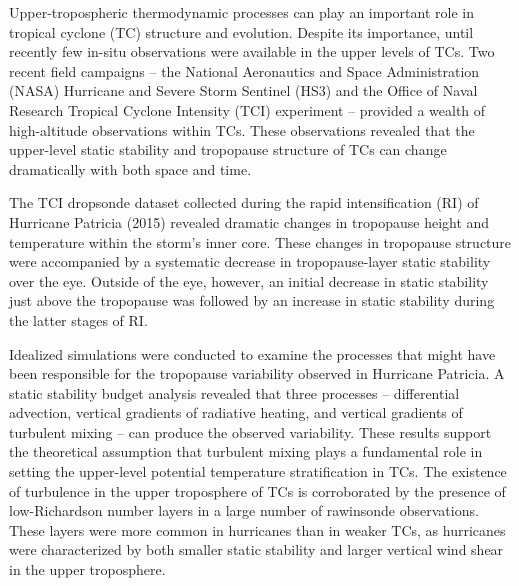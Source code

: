  


\indent \indent Upper-tropospheric thermodynamic processes can play an important role in tropical cyclone (TC) structure and evolution.
Despite its importance, until recently few in-situ observations were available in the upper levels of TCs.
Two recent field campaigns -- the National Aeronautics and Space Administration (NASA) Hurricane and Severe Storm Sentinel (HS3) and the Office of Naval Research Tropical Cyclone Intensity (TCI) experiment -- provided a wealth of high-altitude observations within TCs.
These observations revealed that the upper-level static stability and tropopause structure of TCs can change dramatically with both space and time.

The TCI dropsonde dataset collected during the rapid intensification (RI) of Hurricane Patricia (2015) revealed dramatic changes in tropopause height and temperature within the storm's inner core.
These changes in tropopause structure were accompanied by a systematic decrease in tropopause-layer static stability over the eye.
Outside of the eye, however, an initial decrease in static stability just above the tropopause was followed by an increase in static stability during the latter stages of RI.

Idealized simulations were conducted to examine the processes that might have been responsible for the tropopause variability observed in Hurricane Patricia.
A static stability budget analysis revealed that three processes -- differential advection, vertical gradients of radiative heating, and vertical gradients of turbulent mixing -- can produce the observed variability.
These results support the theoretical assumption that turbulent mixing plays a fundamental role in setting the upper-level potential temperature stratification in TCs.
The existence of turbulence in the upper troposphere of TCs is corroborated by the presence of low-Richardson number layers in a large number of rawinsonde observations.
These layers were more common in hurricanes than in weaker TCs, as hurricanes were characterized by both smaller static stability and larger vertical wind shear in the upper troposphere.

